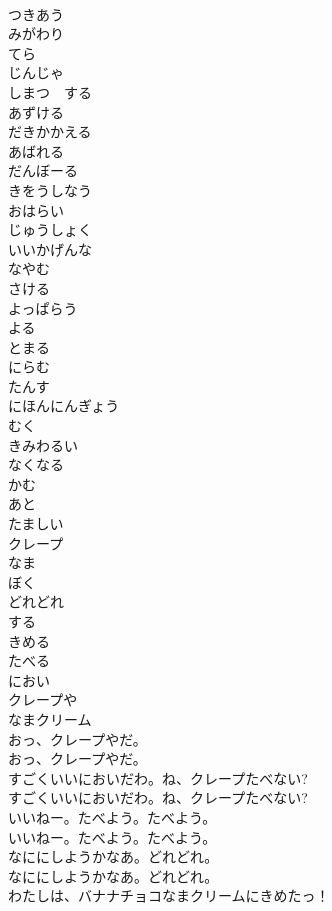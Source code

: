 \documentclass[8pt]{extreport}
\begin{document}
\begin{CJK}{UTF8}{min}
\\	つきあう
\\	みがわり
\\	てら
\\	じんじゃ
\\	しまつ　する
\\	あずける
\\	だきかかえる
\\	あばれる
\\	だんぼーる
\\	きをうしなう
\\	おはらい
\\	じゅうしょく
\\	いいかげんな
\\	なやむ
\\	さける
\\	よっぱらう
\\	よる
\\	とまる
\\	にらむ
\\	たんす
\\	にほんにんぎょう
\\	むく
\\	きみわるい
\\	なくなる
\\	かむ
\\	あと
\\	たましい
\\	クレープ
\\	なま
\\	ぼく
\\	どれどれ
\\	する
\\	きめる
\\	たべる
\\	におい
\\	クレープや
\\	なまクリーム
\\	おっ、クレープやだ。	
\\	おっ、クレープやだ。 
\\	すごくいいにおいだわ。ね、クレープたべない?	
\\	すごくいいにおいだわ。ね、クレープたべない? 
\\	いいねー。たべよう。たべよう。	
\\	いいねー。たべよう。たべよう。 
\\	なににしようかなあ。どれどれ。	
\\	なににしようかなあ。どれどれ。 
\\	わたしは、バナナチョコなまクリームにきめたっ！	

\end{CJK}
\end{document}
